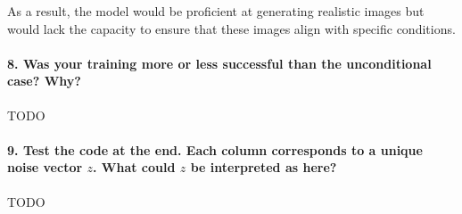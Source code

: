 As a result, the model would be proficient at generating realistic images but would lack the capacity to ensure that these images align with specific conditions.

\paragraph*{8. Was your training more or less successful than the unconditional case? Why?}

TODO


\paragraph*{9. Test the code at the end. Each column corresponds to a unique noise vector $z$. What could $z$ be interpreted as here?}

TODO
